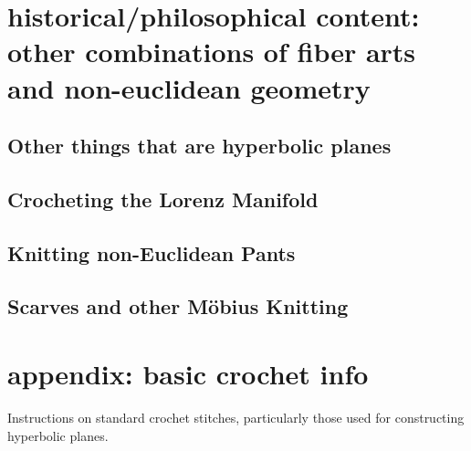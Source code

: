 \documentclass[letterpaper,titlepage]{article}
\begin{document}
\section{historical/philosophical content: other combinations of fiber arts and non-euclidean geometry}
\subsection{Other things that are hyperbolic planes\cite{adventures}}
\subsection{Crocheting the Lorenz Manifold \cite{crochetlorenz}}
\subsection{Knitting non-Euclidean Pants \cite{makingmath}}
\subsection{Scarves and other M\"obius Knitting \cite{magicalknitting}\cite{magicalknitting2}}

\section{appendix: basic crochet info}
Instructions on standard crochet stitches, particularly those used for constructing hyperbolic planes. \cite{happyhooker}

\newpage


\end{document}
